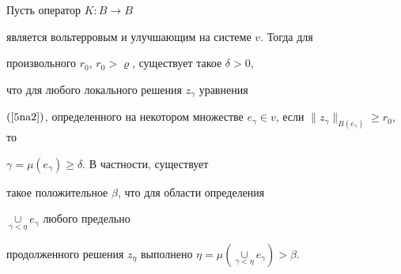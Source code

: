 \begin{thm}


Пусть оператор $K:B \to B$


является вольтерровым и улучшающим на системе $v$. Тогда для


произвольного $r_0$, $r_0>\varrho$, существует такое $\delta>0$,


что для любого локального решения $z_{\gamma}$ уравнения


$(\ref{5na2})$, определенного на некотором множестве $e_\gamma\in


v$, если $\|z_{\gamma}\|_{B(e_{\gamma})} \geqslant r_0$, то


$\gamma =\mu(e_\gamma)\geqslant\delta$. В частности, существует


такое положительное $\beta$, что для области определения


$\mathop{\cup}\limits_{\gamma<\eta}e_\gamma$ любого предельно


продолженного решения $z_\eta $ выполнено $\eta=\mu


(\mathop{\cup}\limits_{\gamma<\eta}e_\gamma)>\beta$.


\end{thm}








